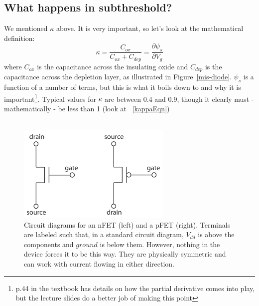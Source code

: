 \documentclass[main]{subfiles}
\begin{document}
\subsection{What happens in subthreshold?}
We mentioned $\kappa$ above. It is very important, so let's look at the mathematical definition:
\begin{equation}
\kappa = \frac{C_{ox}}{C_{ox} + C_{dep}} = \frac{\partial\psi_s}{\partial V_g}
\label{kappaEqn}
\end{equation}
where $C_{ox}$ is the capacitance across the insulating oxide and $C_{dep}$ is the capacitance across the depletion layer, as illustrated in Figure~\ref{mis-diode}. $\psi_s$ is a function of a number of terms, but this is what it boils down to and why it is important\footnote{p.44 in the textbook has details on how the partial derivative comes into play, but the lecture slides do a better job of making this point}. Typical values for $\kappa$ are between 0.4 and 0.9, though it clearly must - mathematically - be less than 1 (look at ~\eqref{kappaEqn}) \\ \\
\begin{figure}[H]
\centering
\includegraphics[width=0.5\linewidth]{figs/nme_mosfets.pdf}
\caption{Circuit diagrams for an nFET (left) and a pFET (right). Terminals are labeled such that, in a standard circuit diagram, $V_{dd}$ is above the components and $ground$ is below them. However, nothing in the device forces it to be this way. They are physically symmetric and can work with current flowing in either direction. \label{mosfetsFig}}
\end{figure}
\end{document}
